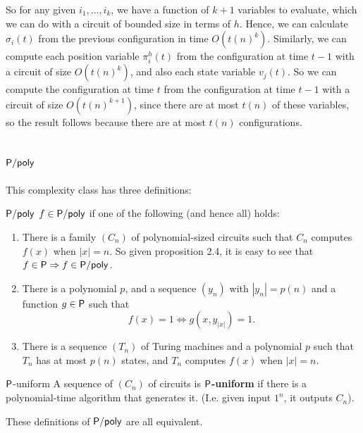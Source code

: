 \documentclass{article}
\begin{document}
So for any given $i_{1}, \dots, i_{k}$, we have a function of $k+1$ variables to evaluate, which we can do with a circuit of bounded size in terms of $h$. Hence, we can calculate $\sigma_{i}(t)$ from the previous configuration in time $O(t(n)^{k})$.
\newlec Similarly, we can compute each position variable $\pi_{i}^{h}(t)$ from the configuration at time $t-1$ with a circuit of size $O(t(n)^{k})$, and also each state variable $v_{j}(t)$. So we can compute the configuration at time $t$ from the configuration at time $t-1$ with a circuit of size $O(t(n)^{k+1})$, since there are at most $t(n)$ of these variables, so the result follows because there are at most $t(n)$ configurations. \endproof
\subsection{$\mathsf{P/poly}$}
This complexity class has three definitions: \begin{fancydefine}{$\mathsf{P/poly}$}
    $f \in \mathsf{P/poly}$ if one of the following (and hence all) holds:
    \begin{enumerate}
        \item There is a family $(C_{n})$ of polynomial-sized circuits such that $C_{n}$ computes $f(x)$ when $|x|=n$. So given proposition 2.4, it is easy to see that $f \in \mathsf{P} \Rightarrow f \in \mathsf{P/poly}$.
        \item There is a polynomial $p$, and a sequence $(y_{n})$ with $|y_{n}| = p(n)$ and a function $g \in \mathsf{P}$ such that \[ f(x)=1 \Leftrightarrow g(x,y_{|x|})=1.\]
        \item There is a sequence $(T_{n})$ of Turing machines and a polynomial $p$ such that $T_{n}$ has at most $p(n)$ states, and $T_{n}$ computes $f(x)$ when $|x|=n$.
    \end{enumerate}
\end{fancydefine}
\begin{fancydefine}{$\mathsf{P}$-uniform}
    A sequence of $(C_{n})$ of circuits is $\mathsf{P}$\textbf{-uniform} if there is a polynomial-time algorithm that generates it. (I.e. given input $1^{n}$, it outputs $C_{n}$).
\end{fancydefine}
\begin{fancyprop}{}
    These definitions of $\mathsf{P/poly}$ are all equivalent.
\end{fancyprop}
\end{document}
